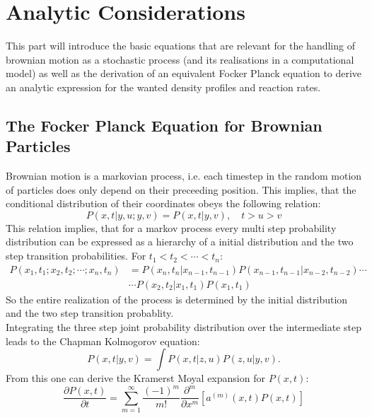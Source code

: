 \section{Analytic Considerations}

This part will introduce the basic equations that are relevant for the handling of brownian motion as a stochastic process (and its realisations in a computational model) as well as the derivation of an equivalent Focker Planck equation to derive an analytic expression for the wanted density profiles and reaction rates.

\subsection{The Focker Planck Equation for Brownian Particles}
Brownian motion is a markovian process, i.e. each timestep in the random motion of particles does only depend on their preceeding position. This implies, that the conditional distribution of their coordinates obeys the following relation:
\begin{equation}
    P(x,t|y,u;y,v) = P(x,t|y,v), \quad t>u>v
    \label{}
\end{equation}
This relation implies, that for a markov process every multi step probability distribution can be expressed as a hierarchy of a initial distribution and the two step transition probabilities. For $ t_1 < t_2 < \cdots < t_n$:
\begin{align}
    P(x_1,t_1;x_2,t_2;\cdots;x_n,t_n) &= P(x_n,t_n|x_{n-1},t_{n-1})P(x_{n-1},t_{n-1}|x_{n-2},t_{n-2}) \cdots \nonumber \\
                                      & \cdots P(x_2,t_2|x_1,t_1)P(x_1,t_1)
    \label{hierarchy}
\end{align}
So the entire realization of the process is determined by the initial distribution and the two step transition probablity. \\
Integrating the three step joint probability distribution over the intermediate step leads to the Chapman Kolmogorov equation:
\begin{equation}
    P(x,t|y,v) = \int P(x,t|z,u) P(z,u|y,v).
    \label{Chapman Kolmogorov equation}
\end{equation}
From this one can derive the Kramerst Moyal expansion for $P(x,t)$:
\begin{equation}
\frac{\partial P(x,t)}{\partial t} = \sum_{m = 1}^{\infty}\frac{(-1)^{m}}{m!}\frac{\partial^m}{\partial x^m} \left[ a^{(m)}(x,t) P(x,t) \right]
    \label{Kramers Moyal expansion}
\end{equation}
